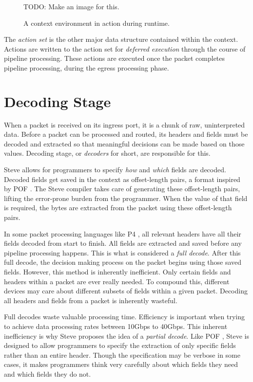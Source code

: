 \begin{figure}
TODO: Make an image for this.
\caption{A context environment in action during runtime.}
\label{fg:ContextEnvWorking}
\end{figure}

The \textit{action set} is the other major data structure contained within the
context. Actions are written to the action set for \textit{deferred execution}
through the course of pipeline processing. These actions are executed once the packet
completes pipeline processing, during the egress processing phase.

\section{Decoding Stage} \label{decoder_desc}

When a packet is received on its ingress port, it is a chunk of raw,
uninterpreted data. Before a packet can be processed and routed, its headers and
fields must be decoded and extracted so that meaningful decisions can be made based on those values. Decoding stage, or \textit{decoders} for short, are responsible for this.

Steve allows for programmers to specify \textit{how} and \textit{which} fields
are decoded. Decoded fields get saved in the context as offset-length pairs, a format inspired by POF \cite{pof, pof_fis, pof_impl}. The Steve compiler takes care of generating these offset-length pairs, lifting the error-prone burden from the programmer. When the value of that field is required, the bytes are extracted from the packet using these offset-length pairs. 

In some packet processing languages like P4 \cite{p4_spec, p4_spec2}, all relevant headers have all their fields
decoded from start to finish. All fields are extracted and saved before any pipeline processing happens. This is what is considered a \textit{full decode}. After this
full decode, the decision making process on the packet begins using those saved
fields. However, this method is inherently inefficient. Only certain fields and
headers within a packet are ever really needed. To compound this, different
devices may care about different subsets of fields within a given packet.
Decoding all headers and fields from a packet is inherently wasteful.

Full decodes waste valuable processing time. Efficiency is important when
trying to achieve data processing rates  between 10Gbps to
40Gbps. This inherent inefficiency is why Steve proposes the idea of a
\textit{partial decode}. Like POF \cite{pof, pof_fis, pof_impl}, Steve
is designed to allow programmers to specify the extraction of only specific
fields rather than an entire header. Though the specification may be verbose in
some cases, it makes programmers think very carefully about which fields they
need and which fields they do not. 

